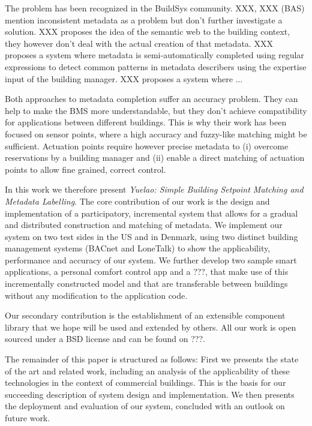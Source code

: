 The problem has been recognized in the BuildSys community.
XXX, XXX (BAS) mention inconsistent metadata as a problem but don't further investigate a solution. 
XXX proposes the idea of the semantic web to the building context, they however don't deal with the actual creation of that metadata. 
XXX proposes a system where metadata is semi-automatically completed using regular expressions to detect common patterns in metadata describers using the expertise input of the building manager. 
XXX proposes a system where ... 

Both approaches to metadata completion suffer an accuracy problem. They can help to make the BMS more understandable, but they don't achieve compatibility for applications between different buildings. This is why their work has been focused on sensor points, where a high accuracy and fuzzy-like matching might be sufficient.
Actuation points require however precise metadata to (i) overcome reservations by a building manager and (ii) enable a direct matching of actuation points to allow fine grained, correct control.

In this work we therefore present \emph{Yuelao: Simple Building Setpoint Matching and Metadata Labelling}.
The core contribution of our work is the design and implementation of a participatory, incremental system that allows for a gradual and distributed construction and matching of metadata.
We implement our system on two test sides in the US and in Denmark, using two distinct building management systems (BACnet and LoneTalk) to show the applicability, performance and accuracy of our system.
We further develop two sample smart applications, a personal comfort control app and a ???,  that make use of this incrementally constructed model and that are transferable between buildings without any modification to the application code.

Our secondary contribution is the establishment of an extensible component library that we hope will be used and extended by others.
All our work is open sourced under a BSD license and can be found on ???.

The remainder of this paper is structured as follows: First we presents the state of the art and related work, including an analysis of the applicability of these technologies in the context of commercial buildings.
This is the basis for our succeeding description of system design and implementation.
We then presents the deployment and evaluation of our system, concluded with an outlook on future work.


